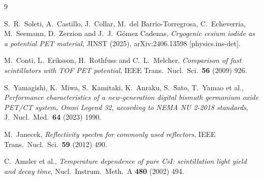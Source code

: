 \documentclass[11pt,a4paper]{article}
\begin{document}
\begin{thebibliography}{9}

S.~R.~Soleti, A.~Castillo, J.~Collar, M.~del Barrio-Torregrosa, C.~Echeverria, M.~Seemann,
D.~Zerzion and J.~J.~G\'omez Cadenas,
\emph{Cryogenic cesium iodide as a potential PET material},
JINST (2025), arXiv:2406.13598 [physics.ins-det].

M.~Conti, L.~Eriksson, H.~Rothfuss and C.~L.~Melcher,
\emph{Comparison of fast scintillators with TOF PET potential},
IEEE Trans.\ Nucl.\ Sci.\ \textbf{56} (2009) 926.

S.~Yamagishi, K.~Miwa, S.~Kamitaki, K.~Anraku, S.~Sato, T.~Yamao et al.,
\emph{Performance characteristics of a new-generation digital bismuth germanium oxide PET/CT
system, Omni Legend 32, according to NEMA NU 2-2018 standards},
J.\ Nucl.\ Med.\ \textbf{64} (2023) 1990.

M.~Janecek,
\emph{Reflectivity spectra for commonly used reflectors},
IEEE Trans.\ Nucl.\ Sci.\ \textbf{59} (2012) 490.

C.~Amsler et al.,
\emph{Temperature dependence of pure CsI: scintillation light yield and decay time},
Nucl.\ Instrum.\ Meth.\ A \textbf{480} (2002) 494.

\end{thebibliography}
\end{document}
